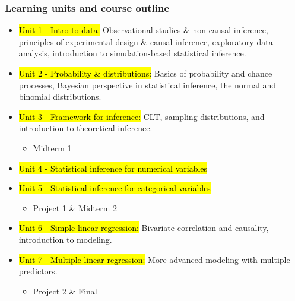 \documentclass[slidestop,compress,mathserif,12pt,t,professionalfonts,xcolor=table]{beamer}
\begin{document}
\begin{frame}
\frametitle{Learning units and course outline}

{\footnotesize
\begin{itemize}[<+->]
\item \hl{Unit 1 - Intro to data:} Observational studies \& non-causal inference, 
principles of experimental design \& causal inference, exploratory data analysis, 
introduction to simulation-based statistical inference.
\item \hl{Unit 2 - Probability \& distributions:} Basics of probability and chance 
processes, Bayesian perspective in statistical inference, the normal and binomial 
distributions.
\item \hl{Unit 3 - Framework for inference:} CLT, sampling distributions, and 
introduction to theoretical inference.
\begin{itemize}
\item Midterm 1
\end{itemize}
\item \hl{Unit 4 - Statistical inference for numerical variables}
\item \hl{Unit 5 - Statistical inference for categorical variables}
\begin{itemize}
\item Project 1 \& Midterm 2
\end{itemize}
\item \hl{Unit 6 - Simple linear regression:} Bivariate correlation and causality, 
introduction to modeling.
\item \hl{Unit 7 - Multiple linear regression:} More advanced modeling with multiple 
predictors.
\begin{itemize}
\item Project 2 \& Final
\end{itemize}
\end{itemize}
}


\end{frame}
\end{document}
